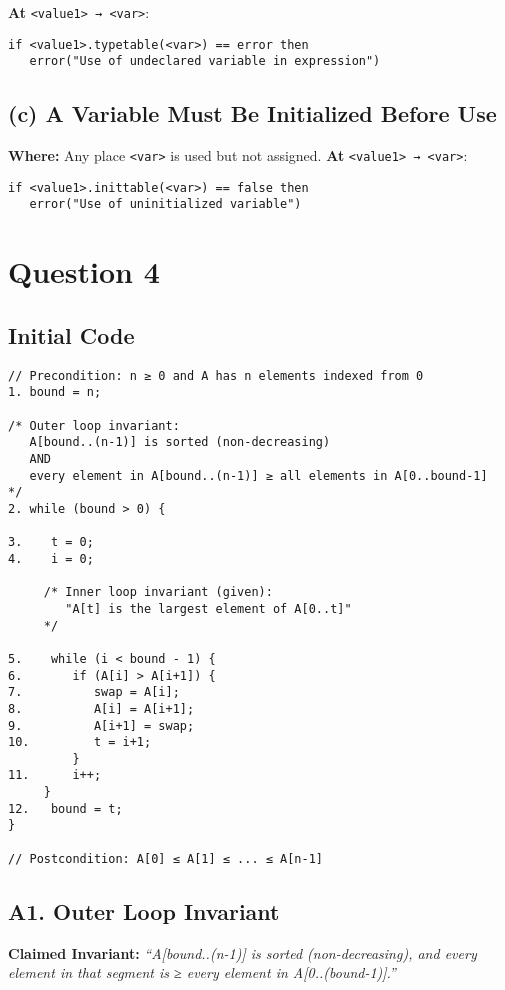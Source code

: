 \documentclass[12pt]{article}
\begin{document}
    \textbf{At} \texttt{<value1> → <var>}:
    \begin{verbatim}
if <value1>.typetable(<var>) == error then
   error("Use of undeclared variable in expression")
    \end{verbatim}

    \subsection*{(c) A Variable Must Be Initialized Before Use}

    \textbf{Where:} Any place \texttt{<var>} is used but not assigned.
    \textbf{At} \texttt{<value1> → <var>}:
    \begin{verbatim}
if <value1>.inittable(<var>) == false then
   error("Use of uninitialized variable")
    \end{verbatim}

    \section*{Question 4}

    \subsection*{Initial Code}
    \begin{verbatim}
// Precondition: n ≥ 0 and A has n elements indexed from 0
1. bound = n;

/* Outer loop invariant:
   A[bound..(n-1)] is sorted (non-decreasing)
   AND
   every element in A[bound..(n-1)] ≥ all elements in A[0..bound-1]
*/
2. while (bound > 0) {

3.    t = 0;
4.    i = 0;

     /* Inner loop invariant (given):
        "A[t] is the largest element of A[0..t]"
     */

5.    while (i < bound - 1) {
6.       if (A[i] > A[i+1]) {
7.          swap = A[i];
8.          A[i] = A[i+1];
9.          A[i+1] = swap;
10.         t = i+1;
         }
11.      i++;
     }
12.   bound = t;
}

// Postcondition: A[0] ≤ A[1] ≤ ... ≤ A[n-1]
    \end{verbatim}

    \subsection*{A1. Outer Loop Invariant}

    \textbf{Claimed Invariant:}
    \emph{``A[bound..(n-1)] is sorted (non-decreasing), and every element in that segment is ≥ every element in A[0..(bound-1)].''}
\end{document}
